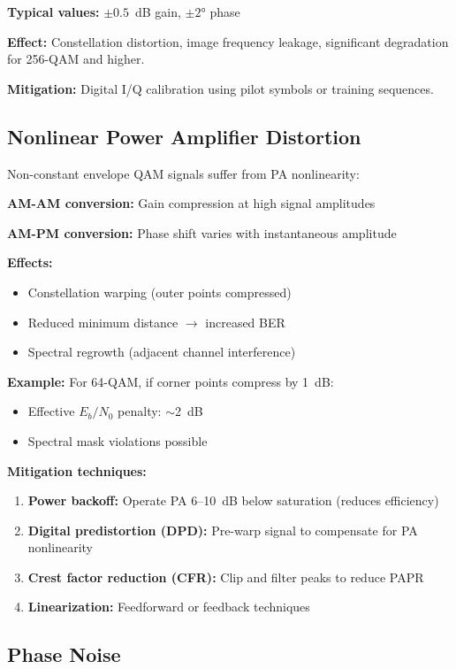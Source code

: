 \textbf{Typical values:} $\pm 0.5$~dB gain, $\pm 2°$ phase

\textbf{Effect:} Constellation distortion, image frequency leakage, significant degradation for 256-QAM and higher.

\textbf{Mitigation:} Digital I/Q calibration using pilot symbols or training sequences.

\subsection{Nonlinear Power Amplifier Distortion}

Non-constant envelope QAM signals suffer from PA nonlinearity:

\textbf{AM-AM conversion:} Gain compression at high signal amplitudes

\textbf{AM-PM conversion:} Phase shift varies with instantaneous amplitude

\textbf{Effects:}
\begin{itemize}
\item Constellation warping (outer points compressed)
\item Reduced minimum distance $\rightarrow$ increased BER
\item Spectral regrowth (adjacent channel interference)
\end{itemize}

\textbf{Example:} For 64-QAM, if corner points compress by 1~dB:
\begin{itemize}
\item Effective $E_b/N_0$ penalty: $\sim$2~dB
\item Spectral mask violations possible
\end{itemize}

\textbf{Mitigation techniques:}
\begin{enumerate}
\item \textbf{Power backoff:} Operate PA 6--10~dB below saturation (reduces efficiency)
\item \textbf{Digital predistortion (DPD):} Pre-warp signal to compensate for PA nonlinearity
\item \textbf{Crest factor reduction (CFR):} Clip and filter peaks to reduce PAPR
\item \textbf{Linearization:} Feedforward or feedback techniques
\end{enumerate}

\subsection{Phase Noise}

